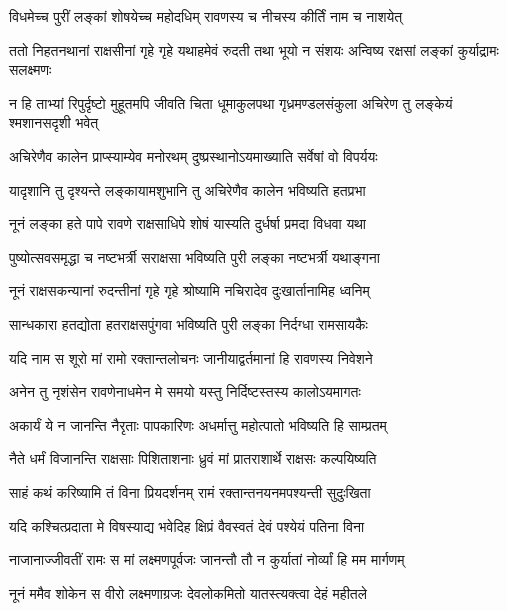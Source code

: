 \twolineshloka
{विधमेच्च पुरीं लङ्कां शोषयेच्च महोदधिम्}
{रावणस्य च नीचस्य कीर्तिं नाम च नाशयेत्} %

\threelineshloka
{ततो निहतनथानां राक्षसीनां गृहे गृहे}
{यथाहमेवं रुदती तथा भूयो न संशयः}
{अन्विष्य रक्षसां लङ्कां कुर्याद्रामः सलक्ष्मणः} %

\threelineshloka
{न हि ताभ्यां रिपुर्दृष्टो मुहूतमपि जीवति}
{चिता धूमाकुलपथा गृध्रमण्डलसंकुला}
{अचिरेण तु लङ्केयं श्मशानसदृशी भवेत्} %

\twolineshloka
{अचिरेणैव कालेन प्राप्स्याम्येव मनोरथम्}
{दुष्प्रस्थानोऽयमाख्याति सर्वेषां वो विपर्ययः} %

\twolineshloka
{यादृशानि तु दृश्यन्ते लङ्कायामशुभानि तु}
{अचिरेणैव कालेन भविष्यति हतप्रभा} %

\twolineshloka
{नूनं लङ्का हते पापे रावणे राक्षसाधिपे}
{शोषं यास्यति दुर्धर्षा प्रमदा विधवा यथा} %

\twolineshloka
{पुष्योत्सवसमृद्धा च नष्टभर्त्री सराक्षसा}
{भविष्यति पुरी लङ्का नष्टभर्त्री यथाङ्गना} %

\twolineshloka
{नूनं राक्षसकन्यानां रुदन्तीनां गृहे गृहे}
{श्रोष्यामि नचिरादेव दुःखार्तानामिह ध्वनिम्} %

\twolineshloka
{सान्धकारा हतद्योता हतराक्षसपुंगवा}
{भविष्यति पुरी लङ्का निर्दग्धा रामसायकैः} %

\twolineshloka
{यदि नाम स शूरो मां रामो रक्तान्तलोचनः}
{जानीयाद्वर्तमानां हि रावणस्य निवेशने} %

\twolineshloka
{अनेन तु नृशंसेन रावणेनाधमेन मे}
{समयो यस्तु निर्दिष्टस्तस्य कालोऽयमागतः} %

\twolineshloka
{अकार्यं ये न जानन्ति नैरृताः पापकारिणः}
{अधर्मात्तु महोत्पातो भविष्यति हि साम्प्रतम्} %

\twolineshloka
{नैते धर्मं विजानन्ति राक्षसाः पिशिताशनाः}
{ध्रुवं मां प्रातराशार्थे राक्षसः कल्पयिष्यति} %

\twolineshloka
{साहं कथं करिष्यामि तं विना प्रियदर्शनम्}
{रामं रक्तान्तनयनमपश्यन्ती सुदुःखिता} %

\twolineshloka
{यदि कश्चित्प्रदाता मे विषस्याद्य भवेदिह}
{क्षिप्रं वैवस्वतं देवं पश्येयं पतिना विना} %

\twolineshloka
{नाजानाज्जीवतीं रामः स मां लक्ष्मणपूर्वजः}
{जानन्तौ तौ न कुर्यातां नोर्व्यां हि मम मार्गणम्} %

\twolineshloka
{नूनं ममैव शोकेन स वीरो लक्ष्मणाग्रजः}
{देवलोकमितो यातस्त्यक्त्वा देहं महीतले} %

